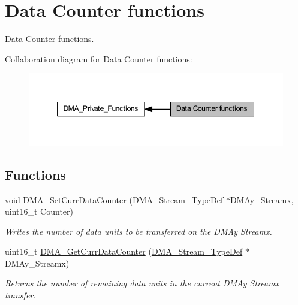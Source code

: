 \hypertarget{group___d_m_a___group2}{}\section{Data Counter functions}
\label{group___d_m_a___group2}


Data Counter functions.  


Collaboration diagram for Data Counter functions\+:\nopagebreak
\begin{figure}[H]
\begin{center}
\leavevmode
\includegraphics[width=350pt]{group___d_m_a___group2}
\end{center}
\end{figure}
\subsection*{Functions}
\begin{DoxyCompactItemize}
\item 
void \hyperlink{group___d_m_a___group2_ga6a11a2c951cff59b125ba8857d44e3f3}{D\+M\+A\+\_\+\+Set\+Curr\+Data\+Counter} (\hyperlink{struct_d_m_a___stream___type_def}{D\+M\+A\+\_\+\+Stream\+\_\+\+Type\+Def} $\ast$D\+M\+Ay\+\_\+\+Streamx, uint16\+\_\+t Counter)
\begin{DoxyCompactList}\small\item\em Writes the number of data units to be transferred on the D\+M\+Ay Streamx. \end{DoxyCompactList}\item 
uint16\+\_\+t \hyperlink{group___d_m_a___group2_ga4a76444a92423f5f15a4328738d6dc46}{D\+M\+A\+\_\+\+Get\+Curr\+Data\+Counter} (\hyperlink{struct_d_m_a___stream___type_def}{D\+M\+A\+\_\+\+Stream\+\_\+\+Type\+Def} $\ast$D\+M\+Ay\+\_\+\+Streamx)
\begin{DoxyCompactList}\small\item\em Returns the number of remaining data units in the current D\+M\+Ay Streamx transfer. \end{DoxyCompactList}\end{DoxyCompactItemize}


